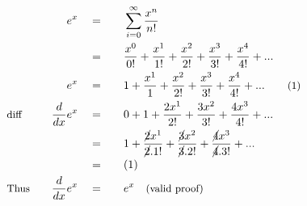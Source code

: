 \begin{alignat*}{5}
&\,&e^x\quad&=\quad&&\sum_{i=0}^\infty\frac{x^n}{n!}\\
&\,&\,&=&&\frac{x^0}{0!}+\frac{x^1}{1!}+\frac{x^2}{2!}+\frac{x^3}{3!}+\frac{x^4}{4!}+...\\
&\,&e^x\quad&=&&1+\frac{x^1}{1}+\frac{x^2}{2!}+\frac{x^3}{3!}+\frac{x^4}{4!}+...\quad&\small\text{(1)}\\
&\small\text{diff}&\frac{d}{dx}e^x\quad&=&&0+1+\frac{2x^1}{2!}+\frac{3x^2}{3!}+\frac{4x^3}{4!}+...\\
&\,&\,&=&&1+\frac{\cancel{2}x^1}{\cancel{2}.1!}+\frac{\cancel{3}x^2}{\cancel{3}.2!}+\frac{\cancel{4}x^3}{\cancel{4}.3!}+...\\
&\,&\,&=&&(1)\\
&\small\text{Thus}\quad&\frac{d}{dx}e^x\quad&=&&e^x\quad\small\text{(valid proof)}
\end{alignat*}

